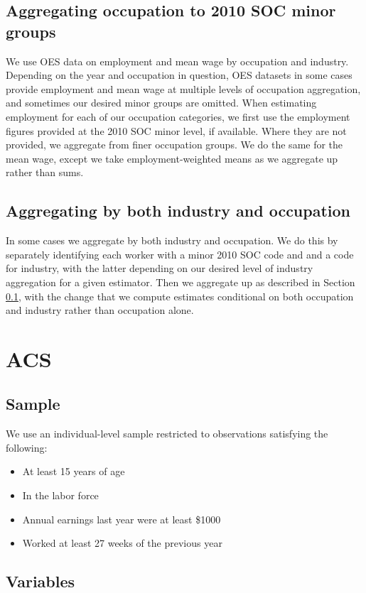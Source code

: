 \documentclass{article}
\begin{document}
\subsection{Aggregating occupation to 2010 SOC minor groups}
\label{OES: aggregation}
We use OES data on employment and mean wage by occupation and industry.
Depending on the year and occupation in question, OES datasets in some cases provide employment and mean wage at multiple levels of occupation aggregation, and sometimes our desired minor groups are omitted.
When estimating employment for each of our occupation categories, we first use the employment figures provided at the 2010 SOC minor level, if available. Where they are not provided, we aggregate from finer occupation groups. We do the same for the mean wage, except we take employment-weighted means as we aggregate up rather than sums.

\subsection{Aggregating by both industry and occupation}
In some cases we aggregate by both industry and occupation. We do this by separately identifying each worker with a minor 2010 SOC code and and a code for industry, with the latter depending on our desired level of industry aggregation for a given estimator. Then we aggregate up as described in Section \ref{OES: aggregation}, with the change that we compute estimates conditional on both occupation and industry rather than occupation alone.

\section{ACS}
\subsection{Sample}
We use an individual-level sample restricted to observations satisfying the following:
\begin{itemize}
\item At least 15 years of age
\item In the labor force
\item Annual earnings last year were at least \$1000
\item Worked at least 27 weeks of the previous year
\end{itemize}

\subsection{Variables}
\end{document}
